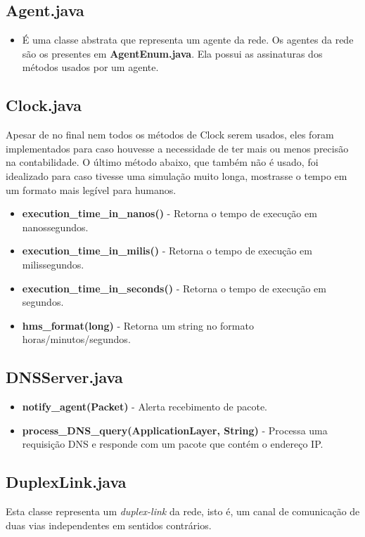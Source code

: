 \documentclass[11pt]{article}
\begin{document}
\subsection{Agent.java}

\begin{itemize}
	\item É uma classe abstrata que representa um agente da rede. Os agentes da rede são os presentes em \textbf{AgentEnum.java}. Ela possui as assinaturas dos métodos usados por um agente.
\end{itemize}

\subsection{Clock.java}

Apesar de no final nem todos os métodos de Clock serem usados, eles foram implementados para caso houvesse a necessidade de ter mais ou menos precisão na contabilidade. O último método abaixo, que também não é usado, 
foi idealizado para caso tivesse uma simulação muito longa, mostrasse o tempo em um formato mais legível para humanos.
\begin{itemize}
	\item \textbf{execution\_time\_in\_nanos()} - Retorna o tempo de execução em nanossegundos.
	\item \textbf{execution\_time\_in\_milis()} - Retorna o tempo de execução em milissegundos.
	\item \textbf{execution\_time\_in\_seconds()} - Retorna o tempo de execução em segundos.
	\item \textbf{hms\_format(long)} - Retorna um string no formato horas/minutos/segundos.
\end{itemize}

\subsection{DNSServer.java}

\begin{itemize}
	\item \textbf{notify\_agent(Packet)} - Alerta recebimento de pacote.
	\item \textbf{process\_DNS\_query(ApplicationLayer, String)} - Processa uma requisição DNS e responde com um pacote que contém o endereço IP.
\end{itemize}

\subsection{DuplexLink.java}
Esta classe representa um \textit{duplex-link} da rede, isto é, um canal de comunicação de duas vias independentes em sentidos contrários.
\end{document}
